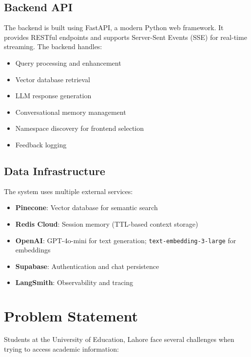 \documentclass[12pt,a4paper]{book}
\numberwithin{table}{chapter}
\numberwithin{figure}{chapter}
\numberwithin{equation}{chapter}
\begin{document}
\subsection{Backend API}
The backend is built using FastAPI, a modern Python web framework. It provides RESTful endpoints and supports Server-Sent Events (SSE) for real-time streaming. The backend handles:
\begin{itemize}
    \item Query processing and enhancement
    \item Vector database retrieval
    \item LLM response generation
    \item Conversational memory management
    \item Namespace discovery for frontend selection
    \item Feedback logging
\end{itemize}

\subsection{Data Infrastructure}
The system uses multiple external services:
\begin{itemize}
    \item \textbf{Pinecone}: Vector database for semantic search
    \item \textbf{Redis Cloud}: Session memory (TTL-based context storage)
    \item \textbf{OpenAI}: GPT-4o-mini for text generation; \texttt{text-embedding-3-large} for embeddings
    \item \textbf{Supabase}: Authentication and chat persistence
    \item \textbf{LangSmith}: Observability and tracing
\end{itemize}

\section{Problem Statement}

Students at the University of Education, Lahore face several challenges when trying to access academic information:
\end{document}
